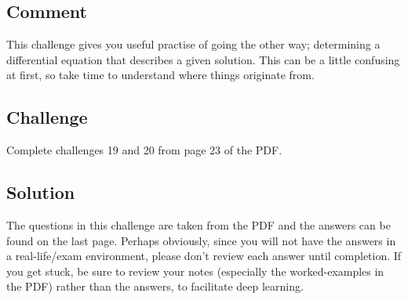 \subsection*{Comment}
This challenge gives you useful practise of going the other way; determining a differential equation that describes a given solution. This can be a little confusing at first, so take time to understand where things originate from.

\subsection*{Challenge}
Complete challenges 19 and 20 from page 23 of the PDF.

\subsection*{Solution}
The questions in this challenge are taken from the PDF and the answers can be found on the last page. Perhaps obviously, since you will not have the answers in a real-life/exam environment, please don't review each answer until completion. If you get stuck, be sure to review your notes (especially the worked-examples in the PDF) rather than the answers, to facilitate deep learning. 


